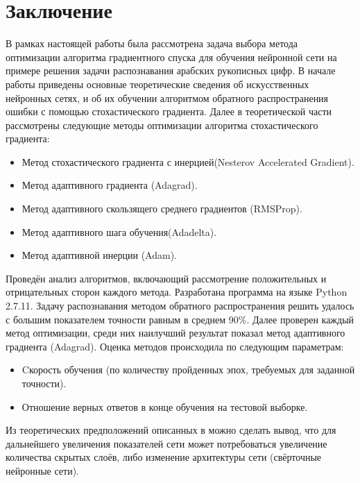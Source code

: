 \documentclass[oneside,final,14pt]{extreport}
\newcommand{\tocsecindent}{\hspace{7mm}}
\begin{document}
\chapter*{Заключение}
\addcontentsline{toc}{chapter}{\tocsecindent{Заключение}}
В рамках настоящей работы была рассмотрена задача выбора метода оптимизации алгоритма градиентного спуска для обучения нейронной сети на примере решения задачи распознавания арабских рукописных цифр. В начале работы приведены основные теоретические сведения об искусственных нейронных сетях, и об их обучении алгоритмом обратного распространения ошибки с помощью стохастического градиента. Далее в теоретической части рассмотрены следующие методы оптимизации алгоритма стохастического градиента:
\begin{itemize}
    \item Метод стохастического градиента с инерцией(Nesterov Accelerated Gradient).
    \item Метод адаптивного градиента (Adagrad).
    \item Метод адаптивного скользящего среднего градиентов (RMSProp).
    \item Метод адаптивного шага обучения(Adadelta).
    \item Метод адаптивной инерции (Adam).
\end{itemize}
Проведён анализ алгоритмов, включающий рассмотрение положительных и отрицательных сторон каждого метода. Разработана программа на языке Python 2.7.11. Задачу распознавания методом обратного распространения решить удалось с большим показателем точности равным в среднем 90\%. Далее проверен каждый метод оптимизации, среди них наилучший результат показал метод адаптивного градиента (Adagrad). Оценка методов происходила по следующим параметрам:
\begin{itemize}
    \item Cкорость обучения (по количеству пройденных эпох, требуемых для заданной точности).
    \item Отношение верных ответов в конце обучения на тестовой выборке.
\end{itemize}
Из теоретических предположений описанных в \cite{hykin:nn} можно сделать вывод, что для дальнейшего увеличения показателей сети может потребоваться увеличение количества скрытых слоёв, либо изменение архитектуры сети (свёрточные нейронные сети).
\end{document}
